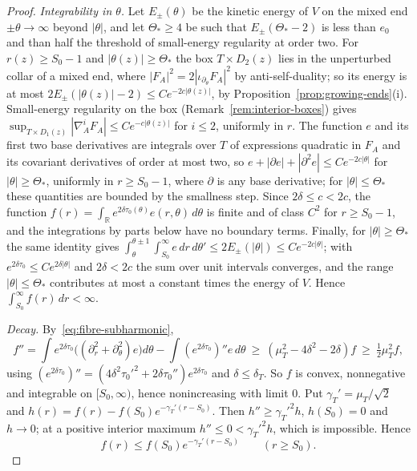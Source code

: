 \documentclass[11pt]{amsart}
\theoremstyle{definition}
\theoremstyle{remark}
\theoremstyle{plain}
\numberwithin{equation}{section}
\newcommand{\RR}{\mathbb{R}}
\begin{document}
\begin{proof}
\emph{Integrability in $\theta$.} Let $E_\pm(\theta)$ be the kinetic energy of $V$ on the mixed
end $\pm\theta\to\infty$ beyond $|\theta|$, and let $\Theta_*\ge4$ be such that $E_\pm(\Theta_*-2)$ is
less than $e_0$ and than half the threshold of small-energy regularity at order two. For
$r(z)\ge S_0-1$ and $|\theta(z)|\ge\Theta_*$ the box $T\times D_2(z)$ lies in the unperturbed
collar of a mixed end, where $|F_A|^2=2|\iota_{\partial_\theta}F_A|^2$ by anti-self-duality; so its
energy is at most $2E_\pm(|\theta(z)|-2)\le Ce^{-2c|\theta(z)|}$, by
Proposition~\ref{prop:growing-ends}(i). Small-energy regularity on the box
(Remark~\ref{rem:interior-boxes}) gives $\sup_{T\times D_1(z)}|\nabla^i_AF_A|\le Ce^{-c|\theta(z)|}$ for
$i\le2$, uniformly in $r$. The function $e$ and its first two base derivatives are integrals
over $T$ of expressions quadratic in $F_A$ and its covariant derivatives of order at most
two, so $e+|\partial e|+|\partial^2e|\le Ce^{-2c|\theta|}$ for $|\theta|\ge\Theta_*$, uniformly in
$r\ge S_0-1$, where $\partial$ is any base derivative; for $|\theta|\le\Theta_*$ these quantities
are bounded by the smallness step. Since $2\delta\le c<2c$, the function
$f(r)=\int_\RR e^{2\delta\tau_0(\theta)}e(r,\theta)\,d\theta$ is finite and of class
$C^2$ for $r\ge S_0-1$, and the integrations by parts below have no boundary terms.
Finally, for $|\theta|\ge\Theta_*$ the same identity gives
$\int_\theta^{\theta\pm1}\int_{S_0}^\infty e\,dr\,d\theta'\le2E_\pm(|\theta|)\le Ce^{-2c|\theta|}$; with
$e^{2\delta\tau_0}\le Ce^{2\delta|\theta|}$ and $2\delta<2c$ the sum over unit intervals converges, and
the range $|\theta|\le\Theta_*$ contributes at most a constant times the energy of $V$. Hence
$\int_{S_0}^\infty f(r)\,dr<\infty$.

\emph{Decay.} By~\eqref{eq:fibre-subharmonic},
\[
f''=\int e^{2\delta\tau_0}\bigl((\partial_r^2+\partial_\theta^2)e\bigr)d\theta
-\int(e^{2\delta\tau_0})''e\,d\theta\ \ge\ (\mu_T^2-4\delta^2-2\delta)f\ \ge\ \tfrac12\mu_T^2f,
\]
using $(e^{2\delta\tau_0})''=(4\delta^2\tau_0'^2+2\delta\tau_0'')e^{2\delta\tau_0}$ and
$\delta\le\delta_T$. So $f$ is convex, nonnegative and integrable on
$[S_0,\infty)$, hence nonincreasing with limit $0$. Put $\gamma_T'=\mu_T/\sqrt2$ and
$h(r)=f(r)-f(S_0)e^{-\gamma_T'(r-S_0)}$. Then $h''\ge\gamma_T'^2h$, $h(S_0)=0$ and
$h\to0$; at a positive interior maximum $h''\le0<\gamma_T'^2h$, which is impossible.
Hence
\[
f(r)\le f(S_0)e^{-\gamma_T'(r-S_0)}\qquad(r\ge S_0).
\]


\end{proof}
\end{document}
